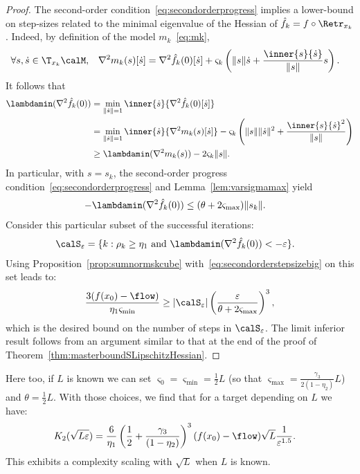 \begin{proof}
	The second-order condition~\eqref{eq:secondorderprogress} implies a lower-bound on step-sizes related to the minimal eigenvalue of the Hessian of $\hat f_k = f \circ \Retr_{x_k}$. Indeed, by definition of the model $m_k$~\eqref{eq:mk},
	\begin{align*}
		\forall s, \dot s \in \T_{x_k}\calM, && \nabla^2 m_k(s)[\dot s] & = \nabla^2 \hat f_k(0)[\dot s] + \varsigma_k\left( \|s\| \dot s + \frac{\inner{s}{\dot s}}{\|s\|}s \right).
	\end{align*}
	It follows that
	\begin{align*}
		\lambdamin(\nabla^2 \hat f_k(0)) & = \min_{\|\dot s\| = 1} \inner{\dot s}{\nabla^2 \hat f_k(0)[\dot s]} \\
			& = \min_{\|\dot s\| = 1} \inner{\dot s}{\nabla^2 m_k(s)[\dot s]} - \varsigma_k \left( \|s\|\|\dot s\|^2 + \frac{\inner{s}{\dot s}^2}{\|s\|} \right) \\ & \geq \lambdamin(\nabla^2 m_k(s)) - 2\varsigma_k \|s\|.
	\end{align*}
	In particular, with $s = s_k$, the second-order progress condition~\eqref{eq:secondorderprogress} and Lemma~\ref{lem:varsigmamax} yield
	\begin{align}
		-\lambdamin(\nabla^2 \hat f_k(0)) & \leq (\theta + 2\varsigma_{\max}) \|s_k\|.
		\label{eq:secondorderstepsizebig}
	\end{align}
	Consider this particular subset of the successful iterations:
	\begin{align*}
		\calS_\varepsilon & = \{  k : \rho_k \geq \eta_1 \textrm{ and } \lambdamin(\nabla^2 \hat f_k(0)) < -\varepsilon \}.
	\end{align*}
	Using Proposition~\ref{prop:sumnormskcube} with~\eqref{eq:secondorderstepsizebig} on this set leads to:
	\begin{align*}
		\frac{3(f(x_0) - \flow)}{\eta_1 \varsigma_{\min}} \geq |\calS_\varepsilon| \left(\frac{\varepsilon}{\theta + 2\varsigma_{\max}}\right)^3,
	\end{align*}
	which is the desired bound on the number of steps in $\calS_\varepsilon$. The limit inferior result follows from an argument similar to that at the end of the proof of Theorem~\ref{thm:masterboundSLipschitzHessian}.
\end{proof}
Here too, if $L$ is known we can set $\varsigma_0 = \varsigma_{\min} = \frac{1}{2}L$ (so that $\varsigma_{\max} = \frac{\gamma_3}{2(1-\eta_2)}L$) and $\theta = \frac{1}{2}L$. With those choices, we find that for a target depending on $L$ we have:
\begin{align}
	K_2(\sqrt{L\varepsilon}) & = \frac{6}{\eta_1} \left(\frac{1}{2} + \frac{\gamma_3}{(1-\eta_2)}\right)^3 (f(x_0) - \flow) \sqrt{L} \frac{1}{\varepsilon^{1.5}}.
\end{align}
This exhibits a complexity scaling with $\sqrt{L}$ when $L$ is known.


